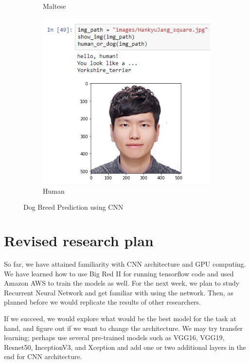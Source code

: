 \documentclass[a4paper]{article}
\begin{document}
\begin{figure}
\begin{subfigure}[b]{0.3\textwidth}
        \caption{Maltese}
        \label{fig:maltese}
    \end{subfigure}
    \begin{subfigure}[b]{0.3\textwidth}
        \includegraphics[width=\textwidth]{images/example2}
        \caption{Human}
        \label{fig:human}
    \end{subfigure}
    \caption{Dog Breed Prediction using CNN}\label{fig:dog_breed}
\end{figure}



\section{Revised research plan}

So far, we have attained familiarity with CNN architecture and GPU computing. We have learned how to use Big Red II for running tensorflow code and used Amazon AWS to train the models as well. For the next week, we plan to study Recurrent Neural Network and get familiar with using the network. Then, as planned before we would replicate the results of other researchers.

If we succeed, we would explore what would be the best model for the task at hand, and figure out if we want to change the architecture. We may try transfer learning; perhaps use several pre-trained models such as VGG16, VGG19, Resnet50, InceptionV3, and Xception and add one or two additional layers in the end for CNN architecture.





\end{document}
